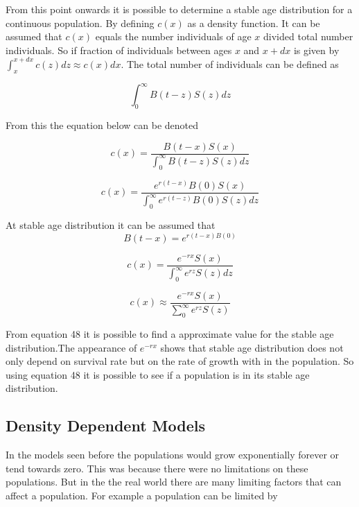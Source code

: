 \documentclass[final]{cmpreport}
\begin{document}
	 From this point onwards it is possible  to determine a stable age distribution for a continuous population. By defining $c(x)$ as a density function. It can be assumed that $c(x)$ equals the number individuals of age $x$ divided total number individuals. So if fraction of individuals between ages $x$ and $x + dx$ is given by $\int_{x}^{x+dx} c(z)dz \approx c(x)dx$. The total number of individuals can be defined as 
	 
	 \begin{equation}
	  \int_0^\infty B(t-z)S(z) dz 
	 \end{equation}
	 
	 From this the equation below can be denoted 
	 
	 \begin{equation} 
	 c(x)= \frac{B(t-x)S(x)}{\int_0^\infty B(t-z)S(z) dz} 
	 \end{equation}
	 
	\begin{equation}
	  c(x)= \frac{e^{r(t-x)}B(0)S(x)}{\int_0^\infty e^{r(t-z)}B(0)S(z) dz} 
	 \end{equation}
	 
	 At stable age distribution it can be assumed that 
	 \begin{equation}
	 B(t-x)=e^{r(t-x)B(0)} 
	 \end{equation}
	 
	 \begin{equation}
	  c(x)= \frac{e^{-rx}S(x)}{\int_0^\infty e^{rz}S(z) dz} 
	 \end{equation}
	 
	 \begin{equation}
	  c(x) \approx \frac{e^{-rx}S(x)}{\sum_0^\infty e^{rz}S(z) } 
	 \end{equation}
	 
	 From equation 48 it is possible to find a approximate value for the stable age distribution.The appearance of $e^{-rx}$ shows that stable age distribution does not only depend on survival rate but on the rate of growth with in the population. So using equation 48 it is possible to see if a population is in its stable age distribution.

	\subsection{Density Dependent Models}
	In the models seen before the populations would grow exponentially forever or tend towards zero. This was because there were no limitations on these populations. But in the the real world there are many limiting factors that can affect a population. For example a population can be limited by 
	
\end{document}
